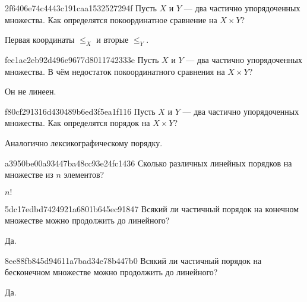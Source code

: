 \begin{note}{2f6406e74c4443c191caa1532527294f}
    Пусть \({ X }\) и \({ Y }\) --- два частично упорядоченных множества.
    Как определятся покоординатное сравнение на \({ X \times Y }\)?

    \begin{cloze}{1}
        Первая координаты \({ \leqslant_{X} }\) и вторые \({ \leqslant_{Y} }\).
    \end{cloze}
\end{note}

\begin{note}{fec1ac2eb92d496e9677d8011742333e}
    Пусть \({ X }\) и \({ Y }\) --- два частично упорядоченных множества.
    В чём недостаток покоординатного сравнения на \({ X \times Y }\)?

    \begin{cloze}{1}
        Он не линеен.
    \end{cloze}
\end{note}

\begin{note}{f80cf291316d430489b6ed3f5ea1f116}
    Пусть \({ X }\) и \({ Y }\) --- два частично упорядоченных множества.
    Как определятся порядок на \({ X \times Y }\)?

    \begin{cloze}{1}
        Аналогично лексикографическому порядку.
    \end{cloze}
\end{note}

\begin{note}{a3950be00a93447ba48cc93e24fc1436}
    Сколько различных линейных порядков на множестве из \({ n }\) элементов?

    \begin{cloze}{1}
        \({ n! }\)
    \end{cloze}
\end{note}

\begin{note}{5dc17edbd7424921a6801b645ec91847}
    Всякий ли частичный порядок на конечном множестве можно продолжить до линейного?

    \begin{cloze}{1}
        Да.
    \end{cloze}
\end{note}

\begin{note}{8ee88fb845d94611a7bad34e78b447b0}
    Всякий ли частичный порядок на бесконечном множестве можно продолжить до линейного?

    \begin{cloze}{1}
        Да.
    \end{cloze}
\end{note}

